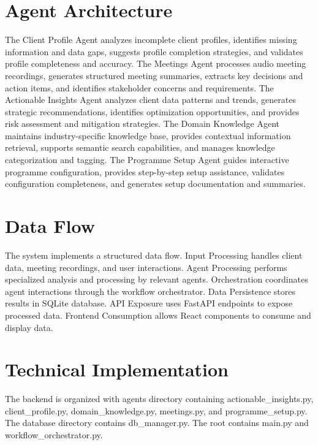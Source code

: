 \documentclass{article}
\begin{document}
\section{Agent Architecture}
The Client Profile Agent analyzes incomplete client profiles, identifies missing information and data gaps, suggests profile completion strategies, and validates profile completeness and accuracy. The Meetings Agent processes audio meeting recordings, generates structured meeting summaries, extracts key decisions and action items, and identifies stakeholder concerns and requirements. The Actionable Insights Agent analyzes client data patterns and trends, generates strategic recommendations, identifies optimization opportunities, and provides risk assessment and mitigation strategies. The Domain Knowledge Agent maintains industry-specific knowledge base, provides contextual information retrieval, supports semantic search capabilities, and manages knowledge categorization and tagging. The Programme Setup Agent guides interactive programme configuration, provides step-by-step setup assistance, validates configuration completeness, and generates setup documentation and summaries.

\section{Data Flow}
The system implements a structured data flow. Input Processing handles client data, meeting recordings, and user interactions. Agent Processing performs specialized analysis and processing by relevant agents. Orchestration coordinates agent interactions through the workflow orchestrator. Data Persistence stores results in SQLite database. API Exposure uses FastAPI endpoints to expose processed data. Frontend Consumption allows React components to consume and display data.

\section{Technical Implementation}
The backend is organized with agents directory containing actionable_insights.py, client_profile.py, domain_knowledge.py, meetings.py, and programme_setup.py. The database directory contains db_manager.py. The root contains main.py and workflow_orchestrator.py.

\end{document}
